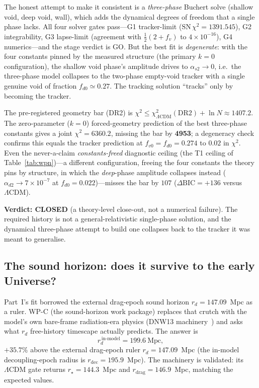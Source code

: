 \documentclass[aps,prd,twocolumn,nofootinbib,superscriptaddress,floatfix]{revtex4-2}
\newcommand{\fvo}{f_{v0}}
\newcommand{\fv}{f_{v}}
\newcommand{\Lcdm}{\Lambda\mathrm{CDM}}
\newcommand{\dBIC}{\Delta\mathrm{BIC}}
\newcommand{\rd}{r_{d}}
\begin{document}
The honest attempt to make it consistent is a \emph{three-phase} Buchert solve
(shallow void, deep void, wall), which adds the dynamical degrees of freedom that
a single phase lacks. All four solver gates pass---G1 tracker-limit
($\mathrm{SN}\,\chi^2=1391.545$), G2 integrability, G3 lapse-limit
(agreement with $\tfrac12(2+\fv)$ to $4\times10^{-16}$), G4 numerics---and the
stage verdict is GO. But the best fit is \emph{degenerate}: with the four
constants pinned by the measured structure (the primary $k=0$ configuration), the
shallow void phase's amplitude drives to $\alpha_{s2}\to0$, i.e.\ the three-phase
model collapses to the two-phase empty-void tracker with a single genuine void of
fraction $f_{d0}\simeq0.27$. The tracking solution ``tracks'' only by becoming
the tracker.

The pre-registered geometry bar (DR2) is
$\chi^2\le\chi^2_{\Lcdm}(\mathrm{DR2})+\ln N\approx1407.2$. The zero-parameter ($k=0$)
forced-geometry prediction of the best three-phase constants gives a joint
$\chi^2=6360.2$, missing the bar by \textbf{4953}; a degeneracy check confirms
this equals the tracker prediction at $\fvo=f_{d0}=0.274$ to $0.02$ in $\chi^2$.
Even the never-a-claim \emph{constants-freed} diagnostic ceiling (the T1 ceiling of
Table~\ref{tab:wpn})---a different configuration, freeing the four constants the
theory pins by structure, in which
the \emph{deep}-phase amplitude collapses instead ($\alpha_{d2}\to7\times10^{-7}$
at $f_{d0}=0.022$)---misses the bar by $107$ ($\dBIC=+136$ versus $\Lcdm$).

\textbf{Verdict: CLOSED} (a theory-level close-out, not a numerical failure). The
required history is not a general-relativistic single-phase solution, and the
dynamical three-phase attempt to build one collapses back to the tracker it was
meant to generalise.

\subsection{The sound horizon: does it survive to the early Universe?}
\label{subsec:soundhorizon}

Part~I's fit borrowed the external drag-epoch sound horizon $\rd=147.09$~Mpc as a
ruler. WP-C (the sound-horizon work package) replaces that crutch with the model's
own bare-frame radiation-era physics (DNW13 machinery~\cite{Duley2013}) and asks
what $\rd$ free-history timescape actually predicts. The answer is
\begin{equation}
\rd^{\,\mathrm{in\text{-}model}}=199.6~\mathrm{Mpc},
\end{equation}
$+35.7\%$ above the external drag-epoch ruler $\rd=147.09$~Mpc (the in-model
decoupling-epoch radius is $r_{\mathrm{dec}}=195.9$~Mpc). The machinery
is validated: its $\Lcdm$ gate returns $r_\star=144.3$~Mpc and
$r_{\mathrm{drag}}=146.9$~Mpc, matching the expected values.
\end{document}
